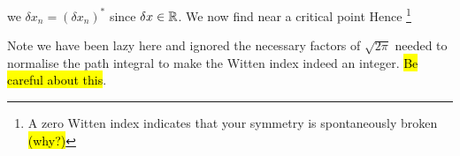 \documentclass{article}
\begin{document}
we $\delta x_n = (\delta x_n)^\ast $ since $\delta x \in \mathbb{R}$. We now find near a critical point 
Hence 
\footnote{A zero Witten index indicates that your symmetry is spontaneously broken \hl{(why?)}}

\begin{remark}
	Note we have been lazy here and ignored the necessary factors of $\sqrt{2\pi}$ needed to normalise the path integral to make the Witten index indeed an integer. \hl{Be careful about this}. 
\end{remark}


\end{document}
